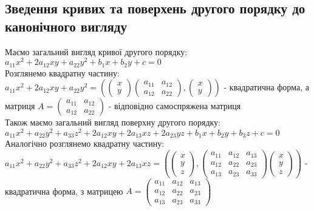 \documentclass[a4paper, 14pt]{extarticle}
\def\bigline{\vspace{5mm}\\}
\begin{document}
\subsection{Зведення кривих та поверхень другого порядку до канонічного вигляду}
Маємо загальний вигляд кривої другого порядку:\\
$a_{11}x^2 + 2a_{12}xy + a_{22}y^2 + b_1x + b_2y + c = 0$\\
Розглянемо квадратну частину:\\
$a_{11}x^2 + 2a_{12}xy + a_{22}y^2 = \left( \begin{pmatrix}
x \\ y
\end{pmatrix} \begin{pmatrix}
 a_{11} & a_{12} \\
 a_{12} & a_{22}
\end{pmatrix}, \begin{pmatrix}
x \\ y
\end{pmatrix} \right)$ - квадратична форма, а матриця $A = \begin{pmatrix}
a_{11} & a_{12} \\
a_{12} & a_{22}
\end{pmatrix}$ - відповідно самоспряжена матриця
\bigline
Також маємо загальний вигляд поверхну другого порядку:\\
$a_{11}x^2 + a_{22}y^2 + a_{33}z^2 + 2a_{12}xy + 2a_{13}xz + 2a_{23}yz + b_1x + b_2y + b_3z + c = 0$\\
Аналогічно розглянемо квадратну частину:\\
$a_{11}x^2 + a_{22}y^2 + a_{33}z^2 + 2a_{12}xy + 2a_{13}xz = \left( \begin{pmatrix}
x \\ y \\ z
\end{pmatrix}, \begin{pmatrix}
a_{11} & a_{12} & a_{13} \\
a_{12} & a_{22} & a_{23} \\
a_{13} & a_{23} & a_{33}
\end{pmatrix} \begin{pmatrix}
x \\ y \\ z
\end{pmatrix} \right)$ - квадратична форма, з матрицею $A = \begin{pmatrix}
a_{11} & a_{12} & a_{13} \\
a_{12} & a_{22} & a_{23} \\
a_{13} & a_{23} & a_{33}
\end{pmatrix}$
\end{document}
